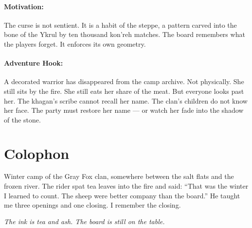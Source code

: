 \paragraph{Motivation:}

The curse is not sentient. It is a habit of the steppe, a pattern carved into the bone of the Ykrul by ten thousand kon'reh matches. The board remembers what the players forget. It enforces its own geometry.

\paragraph{Adventure Hook:}

A decorated warrior has disappeared from the camp archive. Not physically. She still sits by the fire. She still eats her share of the meat. But everyone looks past her. The khagan's scribe cannot recall her name. The clan's children do not know her face. The party must restore her name --- or watch her fade into the shadow of the stone.

\section*{Colophon}

Winter camp of the Gray Fox clan, somewhere between the salt flats and the frozen river. The rider spat tea leaves into the fire and said: ``That was the winter I learned to count. The sheep were better company than the board.'' He taught me three openings and one closing. I remember the closing.

\noindent \textit{The ink is tea and ash. The board is still on the table.}